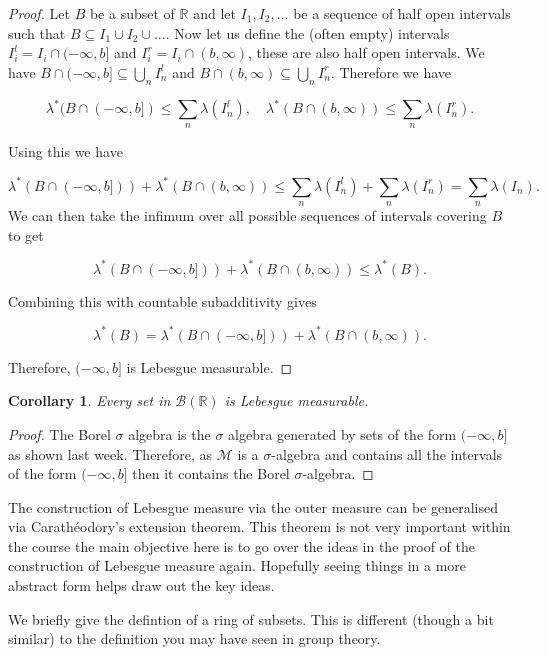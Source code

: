 \documentclass[
]{book}
\newtheorem{corollary}{Corollary}[chapter]
\theoremstyle{definition}
\theoremstyle{definition}
\theoremstyle{definition}
\theoremstyle{definition}
\theoremstyle{remark}
\begin{document}
\begin{proof}
Let \(B\) be a subset of \(\mathbb{R}\) and let \(I_1, I_2, \dots\) be a sequence of half open intervals such that \(B \subseteq I_1 \cup I_2 \cup \dots\). Now let us define the (often empty) intervals \(I^l_i = I_i \cap (-\infty, b]\) and \(I^r_i = I_i \cap (b, \infty)\), these are also half open intervals. We have \(B \cap (-\infty,b] \subseteq \bigcup_n I^l_n\) and \(B \cap (b,\infty) \subseteq \bigcup_n I^r_n\). Therefore we have

\[ \lambda^*(B \cap (-\infty, b]) \leq \sum_n \lambda(I^l_n), \quad \lambda^*(B \cap (b,\infty)) \leq \sum_n \lambda(I^r_n). \]

Using this we have

\[ \lambda^*(B \cap(-\infty,b])) + \lambda^*(B \cap (b,\infty)) \leq \sum_n \lambda(I^l_n) + \sum_n \lambda(I^r_n) = \sum_n \lambda(I_n).\]
We can then take the infimum over all possible sequences of intervals covering \(B\) to get

\[ \lambda^*(B \cap(-\infty,b])) + \lambda^*(B \cap (b,\infty)) \leq \lambda^*(B). \]

Combining this with countable subadditivity gives

\[ \lambda^*(B) = \lambda^*(B \cap(-\infty,b])) + \lambda^*(B \cap (b,\infty)). \]

Therefore, \((-\infty,b]\) is Lebesgue measurable.
\end{proof}

\begin{corollary}
Every set in \(\mathcal{B}(\mathbb{R})\) is Lebesgue measurable.
\end{corollary}

\begin{proof}
The Borel \(\sigma\) algebra is the \(\sigma\) algebra generated by sets of the form \((-\infty, b]\) as shown last week. Therefore, as \(\mathscr{M}\) is a \(\sigma\)-algebra and contains all the intervals of the form \((-\infty, b]\) then it contains the Borel \(\sigma\)-algebra.
\end{proof}

The construction of Lebesgue measure via the outer measure can be generalised via Carathéodory's extension theorem. This theorem is not very important within the course the main objective here is to go over the ideas in the proof of the construction of Lebesgue measure again. Hopefully seeing things in a more abstract form helps draw out the key ideas.

We briefly give the defintion of a ring of subsets. This is different (though a bit similar) to the definition you may have seen in group theory.
\end{document}
